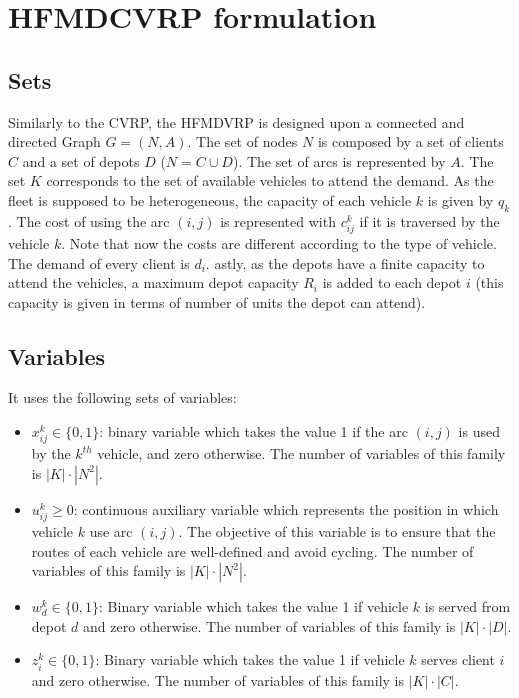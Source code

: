 \documentclass[preprint,review,12pt]{elsarticle}
\begin{document}
\section{HFMDCVRP formulation}

\subsection{Sets}
Similarly to the CVRP, the HFMDVRP is designed upon a connected and directed Graph $G = (N,A)$. The set of nodes $N$ is composed by a set of clients $C$ and a set of depots $D$ ($N = C \cup D$). The set of arcs is represented by $A$. The set $K$ corresponds to the set of available vehicles to attend the demand. As the fleet is supposed to be heterogeneous, the capacity of each vehicle $k$ is given by $q_k$. The cost of using the arc $(i,j)$ is represented with $c_{ij}^k$ if it is traversed by the vehicle $k$. Note that now the costs are different according to the type of vehicle. The demand of every client is $d_i$. astly, as the depots have a finite capacity to attend the vehicles, a maximum depot capacity $R_i$ is added to each depot $i$ (this capacity is given in terms of number of units the depot can attend).

\subsection{Variables}
It uses the following sets of variables:

\begin{itemize}
	\item $x_{ij}^k \in \{0,1\}$: binary variable which takes the value 1 if the arc $(i,j)$ is used by the $k^{th}$ vehicle, and zero otherwise. The number of variables of this family is $|K| \cdot |N^2|$.
	\item $u_{ij}^k \geq 0$: continuous auxiliary variable which represents the position in which vehicle $k$ use arc $(i,j)$. The objective of this variable is to ensure that the routes of each vehicle are well-defined and avoid cycling. The number of variables of this family is $|K| \cdot |N^2|$.
	\item  $w_d^k \in  \{0,1\}$: Binary variable which takes the value 1 if vehicle $k$ is served from depot $d$ and zero otherwise. The number of variables of this family is $|K| \cdot |D|$.
	\item $z_{i}^k \in  \{0,1\}$: Binary variable which takes the value 1 if vehicle $k$ serves client $i$ and zero otherwise. The number of variables of this family is $|K| \cdot |C|$.
\end{itemize}
\end{document}
